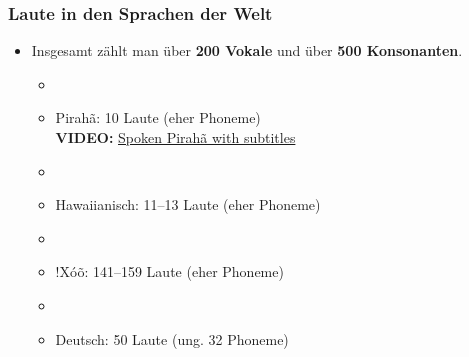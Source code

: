 \begin{frame}
\frametitle{Laute in den Sprachen der Welt}

	\begin{itemize}
		\item Insgesamt zählt man über \textbf{200 Vokale} und über \textbf{500 Konsonanten}.
		
		\begin{itemize}
			\item[]
			\item Pirahã: 10 Laute (eher Phoneme)\\
			\textbf{VIDEO:} \href{run:material/04SpokenPiraha.mp4}{Spoken Pirahã with subtitles}
			\item[]
			\item Hawaiianisch: 11--13 Laute (eher Phoneme)
			\item[]
			\item {!}Xóõ: 141--159 Laute (eher Phoneme)
			\item[]
			\item Deutsch: 50 Laute (ung. 32 Phoneme)
		\end{itemize}
		
	\end{itemize}
	
\end{frame}


